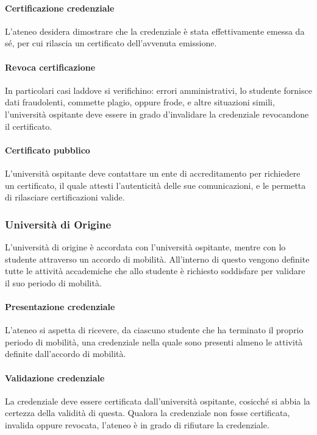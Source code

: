\documentclass[a4paper,12pt]{article}
\begin{document}
\paragraph{Certificazione credenziale} L'ateneo desidera dimostrare che la credenziale è stata effettivamente emessa da sé, per cui rilascia un certificato dell'avvenuta emissione.
\paragraph{Revoca certificazione} In particolari casi laddove si verifichino: errori amministrativi, lo studente fornisce dati fraudolenti, commette plagio, oppure frode, e altre situazioni simili, l'università ospitante deve essere in grado d'invalidare la credenziale revocandone il certificato.
\paragraph{Certificato pubblico} L'università ospitante deve contattare un ente di accreditamento per richiedere un certificato, il quale attesti l'autenticità delle sue comunicazioni, e le permetta di rilasciare certificazioni valide.

\subsubsection{Università di Origine}
L'università di origine è accordata con l'università ospitante, mentre con lo studente attraverso un accordo di mobilità. All'interno di questo vengono definite tutte le attività accademiche che allo studente è richiesto soddisfare per validare il suo periodo di mobilità.
\paragraph{Presentazione credenziale} L'ateneo si aspetta di ricevere, da ciascuno studente che ha terminato il proprio periodo di mobilità, una credenziale nella quale sono presenti almeno le attività definite dall'accordo di mobilità.
\paragraph{Validazione credenziale} La credenziale deve essere certificata dall'università ospitante, cosicché si abbia la certezza della validità di questa. Qualora la credenziale non fosse certificata, invalida oppure revocata, l'ateneo è in grado di rifiutare la credenziale.
\end{document}
